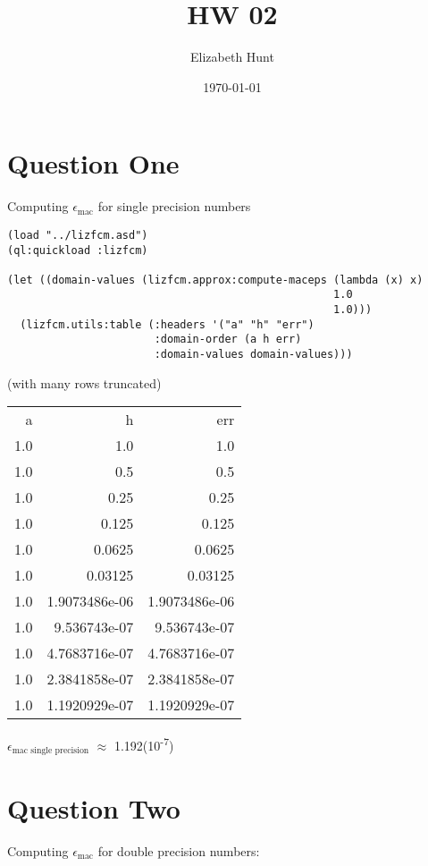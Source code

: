 \documentclass[11pt]{article}
\author{Elizabeth Hunt}
\date{\today}
\title{HW 02}
\begin{document}
\maketitle
\setlength\parindent{0pt}

\section{Question One}
\label{sec:org58b9af4}
Computing \(\epsilon_{\text{mac}}\) for single precision numbers

\begin{verbatim}
(load "../lizfcm.asd")
(ql:quickload :lizfcm)

(let ((domain-values (lizfcm.approx:compute-maceps (lambda (x) x)
                                                   1.0
                                                   1.0)))
  (lizfcm.utils:table (:headers '("a" "h" "err")
                       :domain-order (a h err)
                       :domain-values domain-values)))
\end{verbatim}

(with many rows truncated)

\begin{center}
\begin{tabular}{rrr}
a & h & err\\[0pt]
1.0 & 1.0 & 1.0\\[0pt]
1.0 & 0.5 & 0.5\\[0pt]
1.0 & 0.25 & 0.25\\[0pt]
1.0 & 0.125 & 0.125\\[0pt]
1.0 & 0.0625 & 0.0625\\[0pt]
1.0 & 0.03125 & 0.03125\\[0pt]
1.0 & 1.9073486e-06 & 1.9073486e-06\\[0pt]
1.0 & 9.536743e-07 & 9.536743e-07\\[0pt]
1.0 & 4.7683716e-07 & 4.7683716e-07\\[0pt]
1.0 & 2.3841858e-07 & 2.3841858e-07\\[0pt]
1.0 & 1.1920929e-07 & 1.1920929e-07\\[0pt]
\end{tabular}
\end{center}

\(\epsilon_{\text{mac single precision}}\) \(\approx\) 1.192(10\textsuperscript{-7})

\section{Question Two}
\label{sec:org27557b4}
Computing \(\epsilon_{\text{mac}}\) for double precision numbers:
\end{document}
